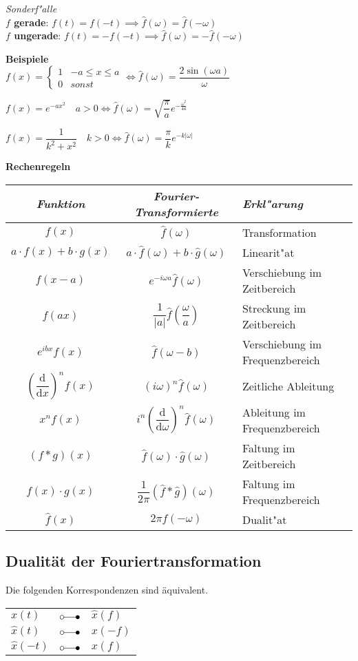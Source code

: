 \emph{Sonderf"alle}\\
\textbf{\(f\) gerade}: \( f(t) = f(-t) \implies \widehat{f}(\omega) = \widehat{f}(-\omega) \)\\
\textbf{\(f\) ungerade}: \( f(t) = -f(-t) \implies \widehat{f}(\omega) = -\widehat{f}(-\omega) \)

\textbf{Beispiele}\\
\(f(x)=\begin{cases} 1 & -a\leqslant x \leqslant a \\ 0 & sonst \end{cases} \Longleftrightarrow
\hat{f}(\omega) = \dfrac{2\sin(\omega a)}{\omega}\)

\(f(x) = e^{-ax^2} \quad a>0 \Longleftrightarrow \hat{f}(\omega) = \sqrt{\dfrac{\pi}{a}} e^{-\frac{\omega^2}{4a}}\)

\(f(x) = \dfrac{1}{k^2+x^2} \quad k>0 \Longleftrightarrow \hat{f}(\omega) = \dfrac{\pi}{k} e^{-k\vert\omega\vert}\)

\textbf{Rechenregeln}\\
\begin{tabular}{ccl}
\emph{Funktion}			&	\emph{Fourier-Transformierte}		&	\emph{Erkl"arung}\\ \hline
\( f(x) \)					&	\( \hat{f}(\omega) \)				&	Transformation \\
\( a\cdot f(x) + b\cdot g(x) \)	&	\( a\cdot \hat{f}(\omega) + b\cdot \hat{g}(\omega) \)
										&	Linearit"at \\
\( f(x-a) \)					&	\( e^{-i\omega a} \hat{f}(\omega) \)	&	Verschiebung im Zeitbereich \\
\( f(ax) \)					&	\( \dfrac{1}{\vert a\vert} \hat{f}(\dfrac{\omega}{a}) \)
										&	Streckung im Zeitbereich \\
\( e^{ibx}f(x) \)				&	\( \hat{f}(\omega-b) \)				&	Verschiebung im Frequenzbereich \\
\( \left(\dfrac{\text{d}}{\text{d}x}\right)^n f(x) \)&	\( (i\omega)^n \hat{f}(\omega) \)	
										&	Zeitliche Ableitung \\
\( x^nf(x) \)				&	\( i^n \left(\dfrac{\text{d}}{\text{d}\omega}\right)^n \hat{f}(\omega) \)
										&	Ableitung im Frequenzbereich \\
\( (f * g)(x) \)				&	\( \hat{f}(\omega)\cdot \hat{g}(\omega) \)
										&	Faltung im Zeitbereich \\
\( f(x)\cdot g(x) \)			&	\( \dfrac{1}{2\pi}(\hat{f} * \hat{g})(\omega) \)
										&	Faltung im Frequenzbereich \\
\( \hat{f}(x) \)				&	\( 2\pi f(-\omega) \)				&	Dualit"at
\end{tabular}
\subsection{Dualität der Fouriertransformation}
Die folgenden Korrespondenzen sind äquivalent.\\
\begin{tabular}{lcl}
	\( x(t) \)		&	\( \laplace \)	&	\( \hat{x}(f) \)\\
	\( \hat{x}(t) \)		&	\( \laplace \)	&	\( x(-f) \)\\
	\( \hat{x}(-t) \)		&	\( \laplace \)	&	\( x(f) \)\\
\end{tabular}

